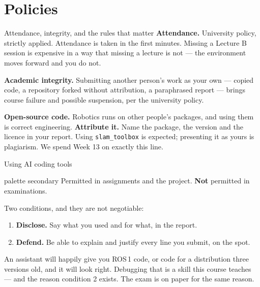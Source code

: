 \documentclass[aspectratio=169]{beamer}
\begin{document}
\section{Policies}

\begin{frame}{Attendance, integrity, and the rules that matter}
  \small
  \textbf{Attendance.} University policy, strictly applied. Attendance is taken in the first
  minutes. Missing a Lecture B session is expensive in a way that missing a lecture is not ---
  the environment moves forward and you do not.

  \vspace{0.7em}
  \textbf{Academic integrity.} Submitting another person's work as your own --- copied code,
  a repository forked without attribution, a paraphrased report --- brings course failure and
  possible suspension, per the university policy.

  \vspace{0.7em}
  \textbf{Open-source code.} Robotics runs on other people's packages, and using them is
  correct engineering. \textbf{Attribute it.} Name the package, the version and the licence
  in your report. Using \texttt{slam\_toolbox} is expected; presenting it as yours is
  plagiarism. We spend Week 13 on exactly this line.
\end{frame}

\begin{frame}{Using AI coding tools}
  \begin{beamercolorbox}[sep=8pt,center,rounded=true]{palette secondary}
    \small Permitted in assignments and the project. \textbf{Not} permitted in examinations.
  \end{beamercolorbox}

  \vspace{0.8em}
  Two conditions, and they are not negotiable:

  \begin{enumerate}\small
    \item \textbf{Disclose.} Say what you used and for what, in the report.
    \item \textbf{Defend.} Be able to explain and justify every line you submit, on the spot.
  \end{enumerate}

  \vspace{0.8em}
  \begin{inthefield}
    \footnotesize
    An assistant will happily give you ROS\,1 code, or code for a distribution three versions
    old, and it will look right. Debugging that is a skill this course teaches --- and the
    reason condition 2 exists. The exam is on paper for the same reason.
  \end{inthefield}
\end{frame}
\end{document}
